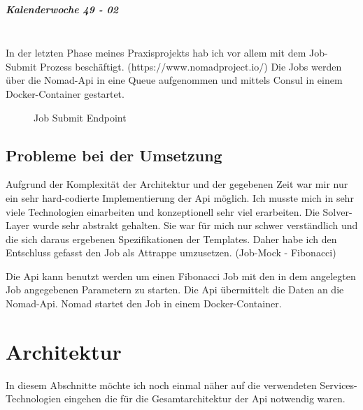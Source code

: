 \documentclass[12pt]{article}
\begin{document}
\subparagraph{Kalenderwoche 49 - 02}\mbox{}\\

In der letzten Phase meines Praxisprojekts hab ich vor allem mit dem Job-Submit Prozess beschäftigt. (https://www.nomadproject.io/) Die Jobs werden über die Nomad-Api in eine Queue aufgenommen und mittels Consul in einem Docker-Container gestartet.

\begin{figure}[h!]
\caption{Job Submit Endpoint}
\label{tab:meinetabelle}
\end{figure}




\subsection{Probleme bei der Umsetzung}

Aufgrund der Komplexität der Architektur und der gegebenen Zeit war mir nur ein sehr hard-codierte Implementierung der Api möglich. Ich musste mich in sehr viele Technologien einarbeiten und konzeptionell sehr viel erarbeiten. Die Solver-Layer wurde sehr abstrakt gehalten. Sie war für mich nur schwer verständlich und die sich daraus ergebenen Spezifikationen der Templates. Daher habe ich den Entschluss gefasst den Job als Attrappe umzusetzen. (Job-Mock - Fibonacci)

Die Api kann benutzt werden um einen Fibonacci Job mit den in dem angelegten Job angegebenen Parametern zu starten. Die Api übermittelt die Daten an die Nomad-Api. Nomad startet den Job in einem Docker-Container.


\newpage

\section{Architektur}

In diesem Abschnitte möchte ich noch einmal näher auf die verwendeten Services-Technologien eingehen die für die Gesamtarchitektur der Api notwendig waren.
\end{document}
